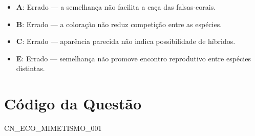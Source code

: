 \documentclass{article}
\begin{document}
\begin{itemize}
  \item \textbf{A}: Errado — a semelhança não facilita a caça das falsas-corais.
  \item \textbf{B}: Errado — a coloração não reduz competição entre as espécies.
  \item \textbf{C}: Errado — aparência parecida não indica possibilidade de híbridos.
  \item \textbf{E}: Errado — semelhança não promove encontro reprodutivo entre espécies distintas.
\end{itemize}

\section*{Código da Questão}

CN\_ECO\_MIMETISMO\_001

\end{document}
